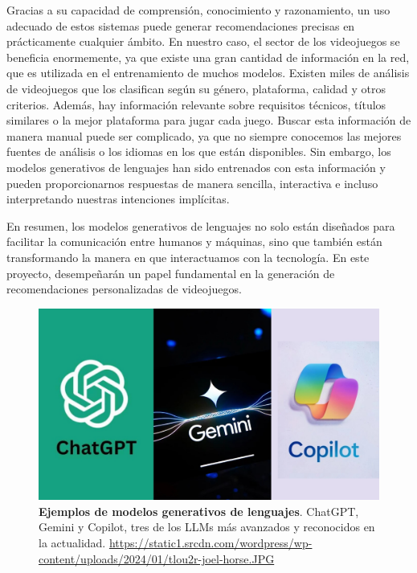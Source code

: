 Gracias a su capacidad de comprensión, conocimiento y razonamiento, un uso adecuado de estos sistemas puede generar recomendaciones precisas en prácticamente cualquier ámbito. En nuestro caso, el sector de los videojuegos se beneficia enormemente, ya que existe una gran cantidad de información en la red, que es utilizada en el entrenamiento de muchos modelos. Existen miles de análisis de videojuegos que los clasifican según su género, plataforma, calidad y otros criterios. Además, hay información relevante sobre requisitos técnicos, títulos similares o la mejor plataforma para jugar cada juego. Buscar esta información de manera manual puede ser complicado, ya que no siempre conocemos las mejores fuentes de análisis o los idiomas en los que están disponibles. Sin embargo, los modelos generativos de lenguajes han sido entrenados con esta información y pueden proporcionarnos respuestas de manera sencilla, interactiva e incluso interpretando nuestras intenciones implícitas.

En resumen, los modelos generativos de lenguajes no solo están diseñados para facilitar la comunicación entre humanos y máquinas, sino que también están transformando la manera en que interactuamos con la tecnología. En este proyecto, desempeñarán un papel fundamental en la generación de recomendaciones personalizadas de videojuegos.

\begin{figure}[H]
    \centering
    \includegraphics[width=1\linewidth]{imagenes/pdl.jpg}
    \caption[\textbf{Ejemplos de modelos generativos de lenguajes}.]{\textbf{Ejemplos de modelos generativos de lenguajes}. ChatGPT, Gemini y Copilot, tres de los LLMs más avanzados y reconocidos en la actualidad. \href{https://static1.srcdn.com/wordpress/wp-content/uploads/2024/01/tlou2r-joel-horse.JPG}{https://static1.srcdn.com/wordpress/wp-content/uploads/2024/01/tlou2r-joel-horse.JPG}}
    \label{modelos-generativos-de-lenguajes}
\end{figure}

